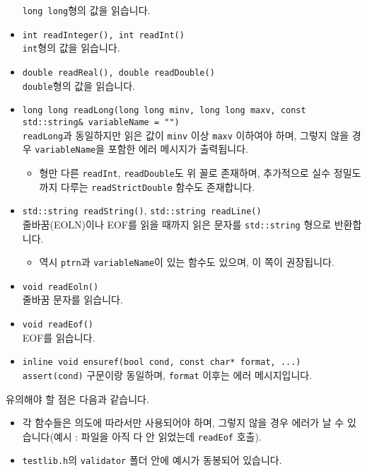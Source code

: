 \documentclass{article}
\begin{document}
\begin{itemize}
        \verb|long long|형의 값을 읽습니다.
        \item \verb|int readInteger(), int readInt()|\\
        \verb|int|형의 값을 읽습니다.
        \item \verb|double readReal(), double readDouble()|\\
        \verb|double|형의 값을 읽습니다.
        \item \verb|long long readLong(long long minv, long long maxv, const std::string& variableName = "")|\\
        \verb|readLong|과 동일하지만 읽은 값이 \verb|minv| 이상 \verb|maxv| 이하여야 하며, 그렇지 않을 경우 \verb|variableName|을 포함한 에러 메시지가 출력됩니다.
        \begin{itemize}
            \item 형만 다른 \verb|readInt|, \verb|readDouble|도 위 꼴로 존재하며, 추가적으로 실수 정밀도까지 다루는 \verb|readStrictDouble| 함수도 존재합니다.
        \end{itemize}
        \item \verb|std::string readString()|, \verb|std::string readLine()|\\
       줄바꿈(EOLN)이나 EOF를 읽을 때까지 읽은 문자를 \verb|std::string| 형으로 반환합니다.
       \begin{itemize}
           \item 역시 \verb|ptrn|과 \verb|variableName|이 있는 함수도 있으며, 이 쪽이 권장됩니다.
       \end{itemize}
       \item \verb|void readEoln()|\\
       줄바꿈 문자를 읽습니다.
       \item \verb|void readEof()|\\
       EOF를 읽습니다.
       \item \verb|inline void ensuref(bool cond, const char* format, ...)|\\
       \verb|assert(cond)| 구문이랑 동일하며, \verb|format| 이후는 에러 메시지입니다.
    \end{itemize}
    유의해야 할 점은 다음과 같습니다.
    \begin{itemize}
        \item 각 함수들은 의도에 따라서만 사용되어야 하며, 그렇지 않을 경우 에러가 날 수 있습니다(예시 : 파일을 아직 다 안 읽었는데 \verb|readEof| 호출).
        \item \verb|testlib.h|의 \verb|validator| 폴더 안에 예시가 동봉되어 있습니다.
    \end{itemize}
\end{document}
